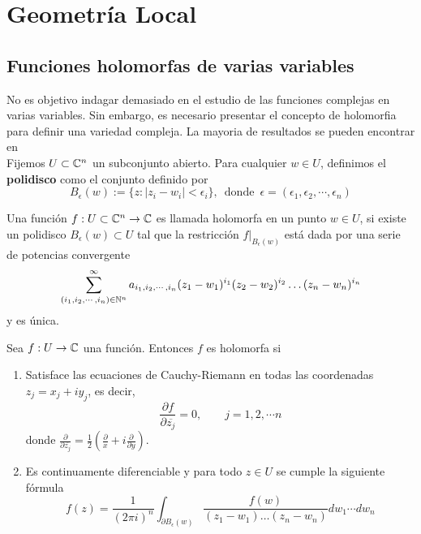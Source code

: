 

\chapter{Geometría Local}
\section{Funciones holomorfas de varias variables}

No es objetivo indagar demasiado en el estudio de las funciones complejas en varias variables. Sin embargo, es necesario presentar el concepto de holomorfia para definir una variedad compleja. La mayoria de resultados se pueden encontrar en \parencite[Cap 1, Sec 1.1]{huybrechts2005complex}\\
Fijemos $U\subset\mathbb{C}^n$ un subconjunto abierto. Para cualquier $w\in U$, definimos el \textbf{polidisco} como el conjunto definido por
\begin{equation*}
	B_\epsilon(w):=\{z: |z_i-w_i|<\epsilon_i\},\enspace \text{donde}\enspace \epsilon=(\epsilon_1,\epsilon_2,\cdots,\epsilon_n)
\end{equation*}

\begin{definition}\label{taylor}
	Una función $f:U\subset \mathbb{C}^n\to\mathbb{C}$ es llamada holomorfa en un punto $w\in U$, si existe un polidisco $B_\epsilon(w)\subset U$ tal que la restricción $f\left.\right|_{B_\epsilon(w)}$ está dada por una serie de potencias convergente \begin{equation*}
		\sum_{(i_1,i_2,\cdots,i_n)\in\mathbb{N}^n}^{\infty}a_{i_1,i_2,\cdots,i_n}(z_1-w_1)^{i_1}(z_2-w_2)^{i_2}\dots(z_n-w_n)^{i_n}
	\end{equation*}
	y es única.
\end{definition}

\begin{remark} Sea $f:U\to\mathbb{C}$ una función. Entonces $f$ es holomorfa si 
	\begin{enumerate}
		\item Satisface las ecuaciones de Cauchy-Riemann en todas las coordenadas $z_j=x_j+iy_j$, es decir,
		\begin{equation*}
			\frac{\partial f}{\partial \overline{z_j}}=0,\qquad j=1,2,\cdots n
		\end{equation*}
		donde $\frac{\partial}{\partial \overline{z_j}}=\frac{1}{2}(\frac{\partial}{x}+i\frac{\partial }{\partial y})$.
		
		\item Es continuamente diferenciable y para todo $z\in U$ se cumple la siguiente fórmula
		\begin{equation*}
			f(z)=\frac{1}{(2\pi i)^n}\int_{\partial B_\epsilon(w)}\frac{f(w)}{(z_1-w_1)\dots(z_n-w_n)}dw_1\cdots dw_n
		\end{equation*}
	\end{enumerate}
	
\end{remark}

